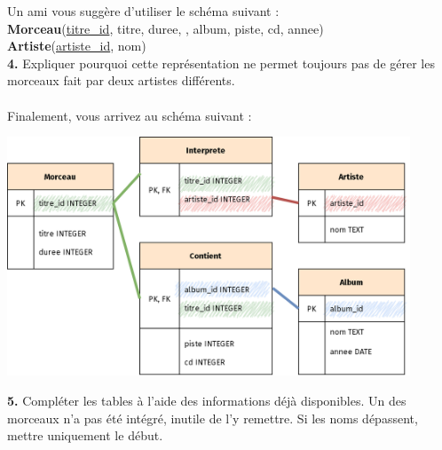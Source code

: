 \documentclass[article,a4paper,firamath,12pt]{nsi}
\begin{document}
Un ami vous suggère d'utiliser le schéma suivant :\\

\textbf{Morceau}(\uline{titre\_id}, titre, duree, , album, piste, cd, annee)\\
\textbf{Artiste}(\uline{artiste\_id}, nom)\\

\textbf{4.}	Expliquer pourquoi cette représentation ne permet toujours pas de gérer les morceaux fait par deux artistes différents.	\\

\\


Finalement, vous arrivez au schéma suivant :
\begin{center}
    \includegraphics[width=12cm]{img/schema}
\end{center}

\textbf{5.}	Compléter les tables à l'aide des informations déjà disponibles. Un des morceaux n'a pas été intégré, inutile de l'y remettre. Si les noms dépassent, mettre uniquement le début.
\end{document}
